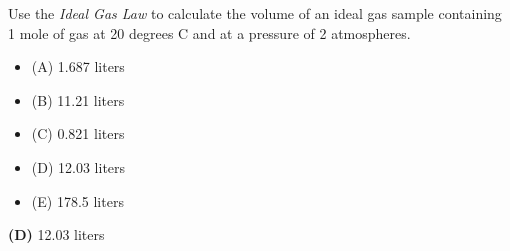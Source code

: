 

Use the {\it Ideal Gas Law} to calculate the volume of an ideal gas sample containing 1 mole of gas at 20 degrees C and at a pressure of 2 atmospheres. 

\begin{itemize}
\item{(A)} 1.687 liters
\vskip 5pt 
\item{(B)} 11.21 liters
\vskip 5pt 
\item{(C)} 0.821 liters
\vskip 5pt 
\item{(D)} 12.03 liters
\vskip 5pt 
\item{(E)} 178.5 liters
\end{itemize}







{\bf (D)} 12.03 liters
 










